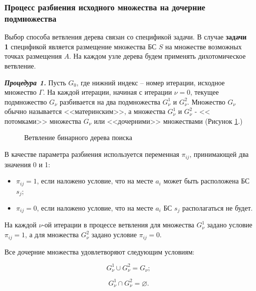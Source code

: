 \subsubsection{Процесс разбиения исходного множества на дочерние подмножества}

Выбор способа ветвления дерева связан со спецификой задачи. В случае \textbf{задачи 1} спецификой является размещение множества БС $S$ на множестве возможных точках размещения $A$. На каждом узле дерева будем применять дихотомическое ветвление.

\textit{\textbf{Процедура 1.}} Пусть $G_0$, где нижний индекс – номер итерации, исходное множество $\Gamma$. На каждой итерации, начиная с итерации $\nu=0$, текущее подмножество $G_\nu$ разбивается на два подмножества $G^1_\nu$ и $G^2_\nu$. Множество $G_\nu$ обычно называется <<материнским>>, а множества $G^1_\nu$  и $G^2_\nu$  - << потомками>> множества $G_\nu$ или <<дочерними>> множествами (Рисунок \cref{fig:part2_bst_child_nodes}.)

\begin{figure}[ht]
  \caption{Ветвление бинарного дерева поиска}\label{fig:part2_bst_child_nodes}
\end{figure}

В качестве параметра разбиения используется переменная $\pi_{ij}$, принимающей два значения 0 и 1:

\begin{itemize}
    \item $\pi_{ij}=1$, если наложено условие, что на месте $a_i$ может быть расположена БС $s_j$;
    \item $\pi_{ij} = 0$, если наложено условие, что на месте $a_i$ БС $s_j$  располагаться не будет.
\end{itemize}

На каждой  $\nu$-ой итерации в процессе ветвления для множества $G^1_\nu$ задано условие $\pi_{ij}=1$, а для множества $G^2_\nu$  задано условие $\pi_{ij} = 0$.

Все дочерние множества удовлетворяют следующим условиям:

\begin{equation}
    \label{eq:part4_G_cup}
    G^1_\nu \cup G^2_\nu = G_\nu;
\end{equation}


\begin{equation}
    \label{eq:part4_G_cap}
    G^1_\nu \cap G^2_\nu = \varnothing.
\end{equation}

